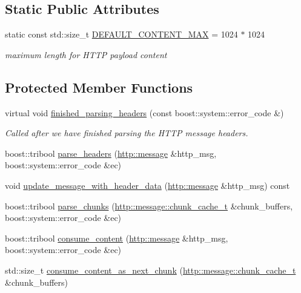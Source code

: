 \subsection*{Static Public Attributes}
\begin{DoxyCompactItemize}
\item 
static const std\-::size\-\_\-t \hyperlink{classpion_1_1http_1_1parser_a77d2e93061f62e1b7028c783145adf22}{D\-E\-F\-A\-U\-L\-T\-\_\-\-C\-O\-N\-T\-E\-N\-T\-\_\-\-M\-A\-X} = 1024 $\ast$ 1024
\begin{DoxyCompactList}\small\item\em maximum length for H\-T\-T\-P payload content \end{DoxyCompactList}\end{DoxyCompactItemize}
\subsection*{Protected Member Functions}
\begin{DoxyCompactItemize}
\item 
virtual void \hyperlink{classpion_1_1http_1_1parser_abed3c66097728d826c4ec771837803ea}{finished\-\_\-parsing\-\_\-headers} (const boost\-::system\-::error\-\_\-code \&)
\begin{DoxyCompactList}\small\item\em Called after we have finished parsing the H\-T\-T\-P message headers. \end{DoxyCompactList}\item 
boost\-::tribool \hyperlink{classpion_1_1http_1_1parser_a7377c221aaf546cfaf98fdb308c8739e}{parse\-\_\-headers} (\hyperlink{classpion_1_1http_1_1message}{http\-::message} \&http\-\_\-msg, boost\-::system\-::error\-\_\-code \&ec)
\item 
void \hyperlink{classpion_1_1http_1_1parser_ad1ffb1db7870fa7cfbcfe743a67aca23}{update\-\_\-message\-\_\-with\-\_\-header\-\_\-data} (\hyperlink{classpion_1_1http_1_1message}{http\-::message} \&http\-\_\-msg) const 
\item 
boost\-::tribool \hyperlink{classpion_1_1http_1_1parser_a658f65ec298a48e01054490da841f75c}{parse\-\_\-chunks} (\hyperlink{classpion_1_1http_1_1message_a4bcf1ea1d4e7a5637d04ae109adb5e46}{http\-::message\-::chunk\-\_\-cache\-\_\-t} \&chunk\-\_\-buffers, boost\-::system\-::error\-\_\-code \&ec)
\item 
boost\-::tribool \hyperlink{classpion_1_1http_1_1parser_aaff1b32ea824c7d7782f8e58346506a7}{consume\-\_\-content} (\hyperlink{classpion_1_1http_1_1message}{http\-::message} \&http\-\_\-msg, boost\-::system\-::error\-\_\-code \&ec)
\item 
std\-::size\-\_\-t \hyperlink{classpion_1_1http_1_1parser_ac7234e092bdd29379a23b720e6566f56}{consume\-\_\-content\-\_\-as\-\_\-next\-\_\-chunk} (\hyperlink{classpion_1_1http_1_1message_a4bcf1ea1d4e7a5637d04ae109adb5e46}{http\-::message\-::chunk\-\_\-cache\-\_\-t} \&chunk\-\_\-buffers)
\end{DoxyCompactItemize}
